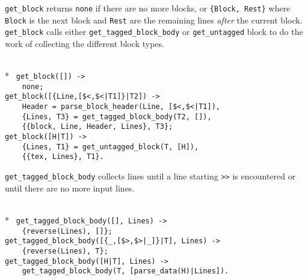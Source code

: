   \verb+get_block+ returns \verb+none+ if there are no more blocks, or
\verb+{Block, Rest}+ where \verb+Block+      is the next  block    and
\verb+Rest+ are the  remaining lines {\sl  after\/} the current block.
\verb+get_block+   calls  either   \verb+get_tagged_block_body+     or
\verb+get_untagged+  block to do  the work of collecting the different
block types.

\begin{flushleft}
\label{parsing_5_13}
\\*
\tt
\noindent{}%
\verb&get_block([]) ->&\\
\noindent{}%
\verb&    none;&\\
\noindent{}%
\verb&get_block([{Line,[$<,$<|T1]}|T2]) ->&\\
\noindent{}%
\verb&    Header = parse_block_header(Line, [$<,$<|T1]),&\\
\noindent{}%
\verb&    {Lines, T3} = get_tagged_block_body(T2, []),&\\
\noindent{}%
\verb&    {{block, Line, Header, Lines}, T3};&\\
\noindent{}%
\verb&get_block([H|T]) ->&\\
\noindent{}%
\verb&    {Lines, T1} = get_untagged_block(T, [H]),&\\
\noindent{}%
\verb&    {{tex, Lines}, T1}.&\\
\end{flushleft}

  \verb+get_tagged_block_body+ collects  lines until  a line  starting
\verb+>>+ is encountered or until there are no more input lines.

\begin{flushleft}
\label{parsing_6_13}
\\*
\tt
\noindent{}%
\verb&get_tagged_block_body([], Lines) ->&\\
\noindent{}%
\verb&    {reverse(Lines), []};&\\
\noindent{}%
\verb&get_tagged_block_body([{_,[$>,$>|_]}|T], Lines) ->&\\
\noindent{}%
\verb&    {reverse(Lines), T};&\\
\noindent{}%
\verb&get_tagged_block_body([H|T], Lines) ->&\\
\noindent{}%
\verb&    get_tagged_block_body(T, [parse_data(H)|Lines]).&\\
\end{flushleft}

